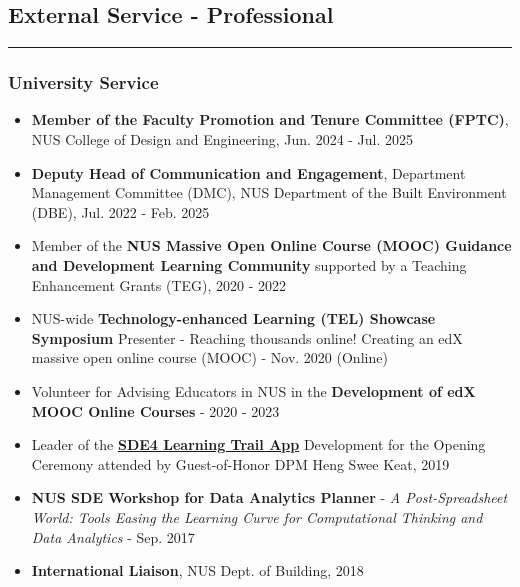 \documentclass[10pt,a4paper]{article}
\begin{document}
\begin{small}




\subsection*{External Service - Professional}
\hrule
\vspace{0.2cm}

\subsubsection*{University Service}

\begin{itemize}
\item
\textbf{Member of the Faculty Promotion and Tenure Committee (FPTC)}, NUS College of Design and Engineering, Jun. 2024 - Jul. 2025
\item
\textbf{Deputy Head of Communication and Engagement}, Department Management Committee (DMC), NUS Department of the Built Environment (DBE), Jul. 2022 - Feb. 2025
\item
Member of the \textbf{NUS Massive Open Online Course (MOOC) Guidance and Development Learning Community} supported by a Teaching Enhancement Grants (TEG), 2020 - 2022
\item
NUS-wide \textbf{Technology-enhanced Learning (TEL) Showcase Symposium} Presenter - Reaching thousands online! Creating an edX massive open online course (MOOC) - Nov. 2020 (Online)
\item
Volunteer for Advising Educators in NUS in the \textbf{Development of edX MOOC Online Courses}  - 2020 - 2023
\item
Leader of the \textbf{\href{https://www.facebook.com/nus.singapore/photos/minister-heng-swee-keat-exploring-the-new-sde-learning-trail-at-the-sde4-south-g/10156946075423540/?paipv=0&eav=AfbGSJ-Ss_QERF57zlowLItK8cMqvQC7A60JtjpwgjSna_qOjxB4__I_E2lcknmGvJ4&_rdr}{SDE4 Learning Trail App}} Development for the Opening Ceremony attended by Guest-of-Honor DPM Heng Swee Keat, 2019
\item 
\textbf{NUS SDE Workshop for Data Analytics Planner} - \emph{A Post-Spreadsheet World: Tools Easing the Learning Curve for Computational Thinking and Data Analytics} - Sep. 2017
\item
\textbf{International Liaison}, NUS Dept. of Building, 2018
\end{itemize}



\end{small}
\end{document}
